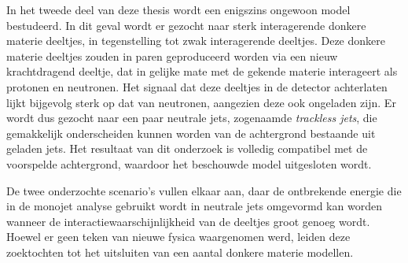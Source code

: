 In het tweede deel van deze thesis wordt een enigszins ongewoon model bestudeerd. In dit geval wordt er gezocht naar sterk interagerende donkere materie deeltjes, in tegenstelling tot zwak interagerende deeltjes. Deze donkere materie deeltjes zouden in paren geproduceerd worden via een nieuw krachtdragend deeltje, dat in gelijke mate met de gekende materie interageert als protonen en neutronen. Het signaal dat deze deeltjes in de detector achterlaten lijkt bijgevolg sterk op dat van neutronen, aangezien deze ook ongeladen zijn. Er wordt dus gezocht naar een paar neutrale jets, zogenaamde \textit{trackless jets}, die gemakkelijk onderscheiden kunnen worden van de achtergrond bestaande uit geladen jets. Het resultaat van dit onderzoek is volledig compatibel met de voorspelde achtergrond, waardoor het beschouwde model uitgesloten wordt.

De twee onderzochte scenario's vullen elkaar aan, daar de ontbrekende energie die in de monojet analyse gebruikt wordt in neutrale jets omgevormd kan worden wanneer de interactiewaarschijnlijkheid van de deeltjes groot genoeg wordt. Hoewel er geen teken van nieuwe fysica waargenomen werd, leiden deze zoektochten tot het uitsluiten van een aantal donkere materie modellen.